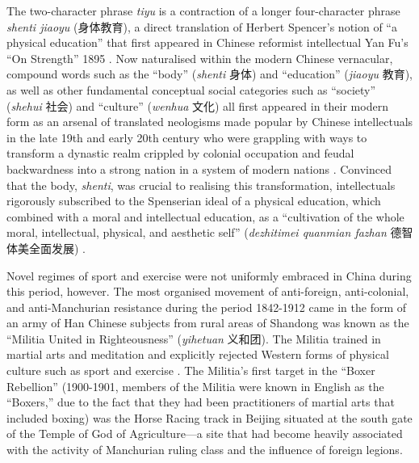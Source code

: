 {The two-character phrase \textit{tiyu} is a contraction of a longer four-character phrase \textit{shenti jiaoyu} (身体教育), a direct translation of Herbert Spencer’s notion of  ``a physical education'' that first appeared in Chinese reformist intellectual Yan Fu’s ``On Strength'' 1895 \citep[9-10]{Morris2004}.  Now naturalised within the modern Chinese vernacular, compound words such as the ``body'' (\textit{shenti} 身体) and ``education'' (\textit{jiaoyu} 教育), as well as other fundamental conceptual social categories such as ``society'' (\textit{shehui} 社会) and ``culture'' (\textit{wenhua} 文化) all first appeared in their modern form as an arsenal of translated neologisms made popular by Chinese intellectuals in the late 19th and early 20th century who were grappling with ways to transform a dynastic realm crippled by colonial occupation and feudal backwardness into a strong nation in a system of modern nations \citep{Pusey1983;Schwartz1964;Liu 1995;Huters2005}.   Convinced that the body, \textit{shenti}, was crucial to realising this transformation, intellectuals rigorously subscribed to the Spenserian ideal of a physical education, which combined with a moral and intellectual education, as a ``cultivation of the whole moral, intellectual, physical, and aesthetic self'' (\textit{dezhitimei quanmian fazhan} 德智体美全面发展) \citep[10]{Morris2004}.

Novel regimes of sport and exercise were not uniformly embraced in China during this period, however.  The most organised movement of anti-foreign, anti-colonial, and anti-Manchurian resistance during the period 1842-1912 came in the form of an army of Han Chinese subjects from rural areas of Shandong was known as the ``Militia United in Righteousness'' (\textit{yihetuan} 义和团).  The Militia trained in martial arts and meditation and explicitly rejected Western forms of physical culture such as sport and exercise \citep{Brownell2008}.  The Militia's first target in the ``Boxer Rebellion'' (1900-1901, members of the Militia were known in English as the ``Boxers,'' due to the fact that they had been practitioners of martial arts that included boxing) was the Horse Racing track in Beijing situated at the south gate of the Temple of God of Agriculture---a site that had become heavily associated with the activity of Manchurian ruling class and the influence of foreign legions.

}
